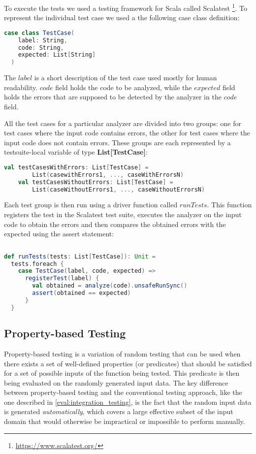 To execute the tests we used a testing framework for Scala called Scalatest \footnote{\url{https://www.scalatest.org/}}. To represent the individual test case we used a the following case class definition:

\begin{lstlisting}[language=Scala]
case class TestCase(
    label: String,
    code: String,
    expected: List[String]
  )
    \end{lstlisting}

The $label$ is a short description of the test case used mostly for human readability. $code$ field holds the code to be analyzed, while the $expected$ field holds the errors that are supposed to be detected by the analyzer in the $code$ field.

All the test cases for a particular analyzer are divided into two groups: one for test cases where the input code contains errors, the other for test cases where the input code does not contain errors. These groups are each represented by a testsuite-local variable of type \textbf{List[TestCase]}:
\begin{lstlisting}[language=Scala]
    val testCasesWithErrors: List[TestCase] = 
        List(casewithErrors1, ..., caseWithErrorsN)
    val testCasesWithoutErrors: List[TestCase] = 
        List(caseWithoutErrors1, ..., caseWithoutErrorsN)
\end{lstlisting}

Each test group is then run using a driver function called $runTests$. This function registers the test in the Scalatest test suite, executes the analyzer on the input code to obtain the errors and then compares the obtained errors with the expected using the assert statement:
\begin{lstlisting}[language=Scala]
    
def runTests(tests: List[TestCase]): Unit =
  tests.foreach { 
    case TestCase(label, code, expected) =>
      registerTest(label) {
        val obtained = analyze(code).unsafeRunSync()
        assert(obtained == expected)
      }
  }

\end{lstlisting}

\subsection{Property-based Testing}
Property-based testing is a variation of random testing that can be used when there exists a set of well-defined properties (or predicates) that should be satisfied for a set of possible inputs of the function being tested.  This predicate is then being evaluated on the randomly generated input data. The key difference between property-based testing and the conventional testing approach, like the one described in \ref{eval:integration_testing}, is the fact that the random input data is generated \textit{automatically}, which covers a large effective subset of the input domain that would otherwise be impractical or impossible to perform manually.

